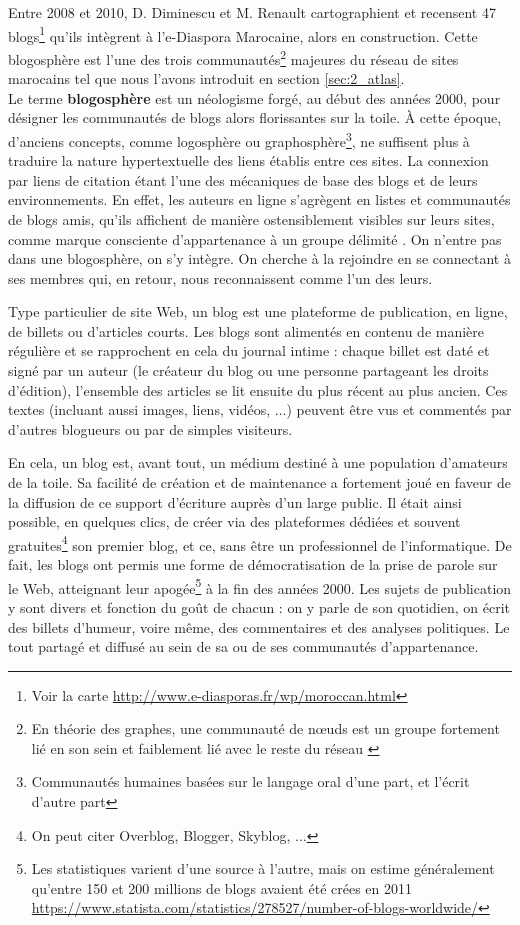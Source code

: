 \documentclass[symmetric,justified,marginals=raggedouter]{tufte-book}
\begin{document}
\noindent Entre 2008 et 2010, D. Diminescu et M. Renault cartographient et recensent 47 blogs\footnote{Voir la carte \url{http://www.e-diasporas.fr/wp/moroccan.html}} qu'ils intègrent à l'e-Diaspora Marocaine, alors en construction. Cette blogosphère est l'une des trois communautés\footnote{En théorie des graphes, une communauté de nœuds est un groupe fortement lié en son sein et faiblement lié avec le reste du réseau \citep{wasserman_social_1994, scott_social_2017}} majeures du réseau de sites marocains tel que nous l'avons introduit en section \ref{sec:2_atlas}. \\

\noindent Le terme \textbf{blogosphère} est un néologisme forgé, au début des années 2000, pour désigner les communautés de blogs alors florissantes sur la toile. À cette époque, d'anciens concepts, comme logosphère ou graphosphère\footnote{Communautés humaines basées sur le langage oral d'une part, et l'écrit d'autre part}, ne suffisent plus à traduire la nature hypertextuelle des liens établis entre ces sites. La connexion par liens de citation étant l'une des mécaniques de base des blogs et de leurs environnements. En effet, les auteurs en ligne s'agrègent en listes et communautés de blogs amis, qu'ils affichent de manière ostensiblement visibles sur leurs sites, comme marque consciente d'appartenance à un groupe délimité \citep{keren_blogosphere:_2006}. On n'entre pas dans une blogosphère, on s'y intègre. On cherche à la rejoindre en se connectant à ses membres qui, en retour, nous reconnaissent comme l'un des leurs.   

Type particulier de site Web, un blog est une plateforme de publication, en ligne, de billets ou d'articles courts. Les blogs sont alimentés en contenu de manière régulière et se rapprochent en cela du journal intime : chaque billet est daté et signé par un auteur (le créateur du blog ou une personne partageant les droits d'édition), l'ensemble des articles se lit ensuite du plus récent au plus ancien. Ces textes (incluant aussi images, liens, vidéos, ...) peuvent être vus et commentés par d'autres blogueurs ou par de simples visiteurs. 

En cela, un blog est, avant tout, un médium destiné à une population d'ama\-teurs de la toile. Sa facilité de création et de maintenance a fortement joué en faveur de la diffusion de ce support d'écriture auprès d'un large public. Il était ainsi possible, en quelques clics, de créer via des plateformes dédiées et souvent gratuites\footnote{On peut citer Overblog, Blogger, Skyblog, ...} son premier blog, et ce, sans être un professionnel de l'informatique. De fait, les blogs ont permis une forme de démocratisation de la prise de parole sur le Web, atteignant leur apogée\footnote{Les statistiques varient d'une source à l'autre, mais on estime généralement qu'entre 150 et 200 millions de blogs avaient été crées en 2011 \url{https://www.statista.com/statistics/278527/number-of-blogs-worldwide/}} à la fin des années 2000. Les sujets de publication y sont divers et fonction du goût de chacun : on y parle de son quotidien, on écrit des billets d'humeur, voire même, des commentaires et des analyses politiques. Le tout partagé et diffusé au sein de sa ou de ses communautés d'appartenance.  
\end{document}
